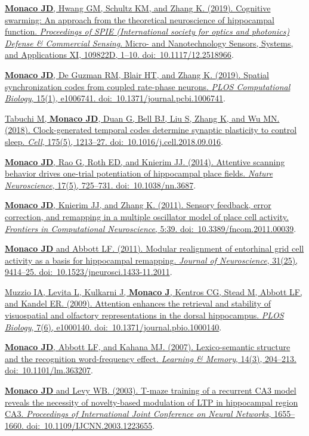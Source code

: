 \documentclass[10pt]{article}
\begin{document}
\begin{description}
\item \href{https://doi.org/10.1117/12.2518966}{\textbf{Monaco JD}, Hwang GM,
Schultz KM, and Zhang K. (2019). Cognitive swarming: An approach from the
theoretical neuroscience of hippocampal function. \emph{Proceedings of SPIE
(International society for optics and photonics) Defense \& Commercial Sensing}.
Micro- and Nanotechnology Sensors, Systems, and Applications XI, 109822D, 1--10.
doi:~10.1117/12.2518966}.
\item \href{https://doi.org/10.1371/journal.pcbi.1006741}{\textbf{Monaco JD},
De Guzman RM, Blair HT, and Zhang K. (2019). Spatial synchronization codes from
coupled rate-phase neurons. \emph{PLOS Computational Biology}, 15(1), e1006741.
doi:~10.1371/journal.pcbi.1006741}.
\item \href{https://www.cell.com/cell/fulltext/S0092-8674(18)31228-5}{Tabuchi
M, \textbf{Monaco JD}, Duan G, Bell BJ, Liu S, Zhang K, and Wu MN. (2018).
Clock-generated temporal codes determine synaptic plasticity to control sleep.
\emph{Cell}, 175(5), 1213--27. doi:~10.1016/j.cell.2018.09.016}.
\item \href{http://dx.doi.org/10.1038/nn.3687}{\textbf{Monaco JD}, Rao G,
Roth ED, and Knierim JJ. (2014). Attentive scanning behavior drives one-trial
potentiation of hippocampal place fields. \emph{Nature Neuroscience}, 17(5),
725--731. doi:~10.1038/nn.3687}.
\item \href{http://dx.doi.org/10.3389/fncom.2011.00039}{\textbf{Monaco JD},
Knierim JJ, and Zhang K. (2011). Sensory feedback, error correction, and
remapping in a multiple oscillator model of place cell activity. \emph{Frontiers
in Computational Neuroscience}, 5:39. doi:~10.3389/fncom.2011.00039}.
\item \href{http://dx.doi.org/10.1523/JNEUROSCI.1433-11.2011}{\textbf{Monaco
JD} and Abbott LF. (2011). Modular realignment of entorhinal grid cell activity
as a basis for hippocampal remapping. \emph{Journal of Neuroscience}, 31(25),
9414--25. doi:~10.1523/jneurosci.1433-11.2011}.
\item \href{http://dx.doi.org/10.1371/journal.pbio.1000140}{Muzzio IA, Levita
L, Kulkarni J, \textbf{Monaco J}, Kentros CG, Stead M, Abbott LF, and Kandel
ER. (2009). Attention enhances the retrieval and stability of visuospatial and
olfactory representations in the dorsal hippocampus. \emph{PLOS Biology}, 7(6),
e1000140. doi:~10.1371/journal.pbio.1000140}.
\item \href{http://dx.doi.org/10.1101/lm.363207}{\textbf{Monaco JD},
Abbott LF, and Kahana MJ. (2007). Lexico-semantic structure and the
recognition word-frequency effect. \emph{Learning \& Memory}, 14(3), 204--213.
doi:~10.1101/lm.363207}.
\item \href{http://dx.doi.org/10.1109/IJCNN.2003.1223655}{\textbf{Monaco
JD} and Levy WB. (2003). T-maze training of a recurrent CA3 model reveals
the necessity of novelty-based modulation of LTP in hippocampal region CA3.
\emph{Proceedings of International Joint Conference on Neural Networks},
1655--1660. doi:~10.1109/IJCNN.2003.1223655}.
\end{description}
\end{document}
